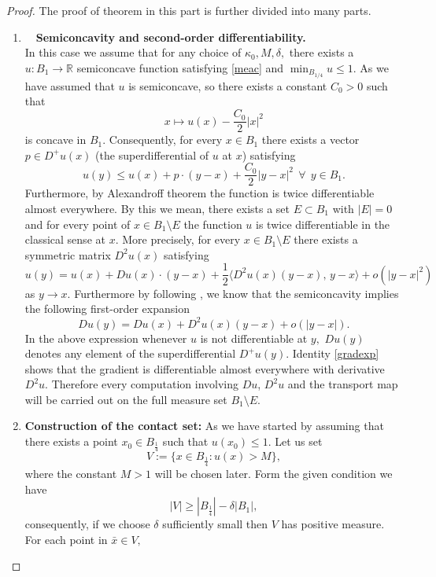\documentclass{amsart}
\theoremstyle{plain}
\numberwithin{equation}{section}
\begin{document}
\begin{proof}
The proof of theorem in this part is further divided into many parts.
\begin{enumerate}
\item~~\textbf{Semiconcavity and second-order differentiability.}\\
In this case we assume that for any choice of $\kappa_{0}, M,\delta,$ there exists a $u:B_{1}\rightarrow\mathbb{R}$ semiconcave function satisfying \eqref{meac} and $\min_{B_{1/4}}u\leq 1.$ As we have assumed that $u$ is semiconcave, so there exists a constant $C_{0}>0$ such that
\[x\longmapsto u(x)-\frac{C_{0}}{2}|x|^{2}\]
is concave in $B_{1}.$ Consequently, for every $x\in B_{1}$ there exists a vector $p\in D^{+}u(x)$ (the superdifferential of $u$ at $x$) satisfying
\begin{equation}\label{SC1}
u(y)\leq u(x)+p\cdot (y-x)+\frac{C_{0}}{2}|y-x|^{2}~~\forall~~y\in B_{1}.
\end{equation}
Furthermore, by Alexandroff theorem the function is twice differentiable almost everywhere. By this we mean, there exists a set $E\subset B_{1}$ with $|E|=0$ and for every point of $x\in B_{1}\setminus E$  the function $u$ is twice differentiable in the classical sense at $x$. More precisely, for every $x\in B_{1}\setminus E$ there exists a symmetric matrix $D^{2}u(x)$ satisfying
\[u(y)=u(x)+Du(x)\cdot(y-x)+\frac12\langle D^{2}u(x)(y-x),\,y-x\rangle+o(|y-x|^{2})\]
as $y\to x$. Furthermore by following \cite{imbert2016estimates}, we know that the semiconcavity implies the following first-order expansion
\begin{equation}\label{gradexp}
Du(y)=Du(x)+D^{2}u(x)(y-x)+o(|y-x|).
\end{equation}
In the above expression whenever $u$ is not differentiable at $y,$ $Du(y)$ denotes any element of the superdifferential $D^{+}u(y).$ Identity \eqref{gradexp} shows that the gradient is differentiable
almost everywhere with derivative $D^{2}u$. Therefore every computation involving $Du$, $D^{2}u$ and the transport map will be carried out on the full measure set $B_{1}\setminus E.$
\\
\item{} \textbf{Construction of the contact set:} As we have started by assuming that there exists a point $x_{0}\in B_{\frac{1}{4}}$ such that $u(x_{0})\leq1.$ Let us set
\[V:=\{x\in B_{\frac14}:u(x)>M\},\]
where the constant $M>1$ will be chosen later. Form the given condition we have
\[|V|\geq|B_{\frac14}|-\delta|B_{1}|,\]
consequently, if we choose $\delta$ sufficiently small then $V$ has positive measure. For each point in $\bar x\in V,$

\end{enumerate}
\end{proof}
\end{document}
